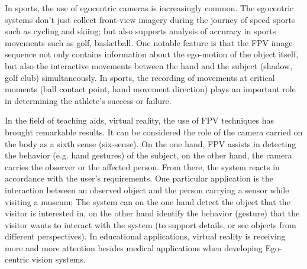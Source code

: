 In sports, the use of egocentric cameras is increasingly common. The egocentric systems don't just collect front-view imagery during the journey of speed sports such as cycling and skiing; but also supports analysis of accuracy in sports movements such as golf, basketball. One notable feature is that the FPV image sequence not only contains information about the ego-motion of the object itself, but also the interactive movements between the hand and the subject (shadow, golf club) simultaneously. In sports, the recording of movements at critical moments (ball contact point, hand movement direction) plays an important role in determining the athlete's success or failure.

In the field of teaching aids, virtual reality, the use of FPV techniques has brought remarkable results. It can be considered the role of the camera carried on the body as a sixth sense (six-sense). On the one hand, FPV assists in detecting the behavior (e.g. hand gestures) of the subject, on the other hand, the camera carries the observer or the affected person. From there, the system reacts in accordance with the user's requirements. One particular application is the interaction between an observed object and the person carrying a sensor while visiting a museum; The system can on the one hand detect the object that the visitor is interested in, on the other hand identify the behavior (gesture) that the visitor wants to interact with the system (to support details, or see objects from different perspectives). In educational applications, virtual reality is receiving more and more attention besides medical applications when developing Ego-centric vision systems.

